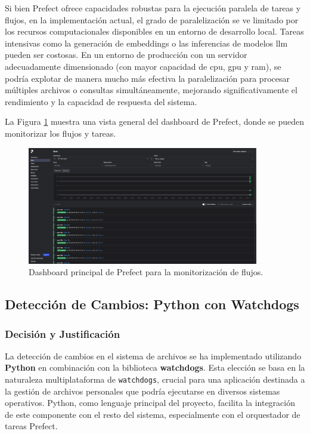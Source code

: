 Si bien Prefect ofrece capacidades robustas para la ejecución paralela de tareas y flujos, en la implementación actual, el grado de paralelización se ve limitado por los recursos computacionales disponibles en un entorno de desarrollo local. Tareas intensivas como la generación de embeddings o las inferencias de modelos \gls{llm} pueden ser costosas. En un entorno de producción con un servidor adecuadamente dimensionado (con mayor capacidad de \gls{cpu}, \gls{gpu} y \gls{ram}), se podría explotar de manera mucho más efectiva la paralelización para procesar múltiples archivos o consultas simultáneamente, mejorando significativamente el rendimiento y la capacidad de respuesta del sistema.

La Figura \ref{fig:prefect_dashboard} muestra una vista general del dashboard de Prefect, donde se pueden monitorizar los flujos y tareas.

\begin{figure}[!htbp]
    \centering
    \includegraphics[width=0.9\textwidth]{archivos/prefect.png}
    \caption{Dashboard principal de Prefect para la monitorización de flujos.}
    \label{fig:prefect_dashboard}
\end{figure}

\subsection{Detección de Cambios: Python con Watchdogs}
\label{subsec:decision_watchdogs}
\subsubsection{Decisión y Justificación}
La detección de cambios en el sistema de archivos se ha implementado utilizando \textbf{Python} en combinación con la biblioteca \textbf{watchdogs}. Esta elección se basa en la naturaleza multiplataforma de \texttt{watchdogs}, crucial para una aplicación destinada a la gestión de archivos personales que podría ejecutarse en diversos sistemas operativos. Python, como lenguaje principal del proyecto, facilita la integración de este componente con el resto del sistema, especialmente con el orquestador de tareas Prefect.

